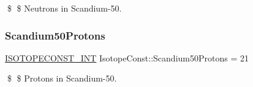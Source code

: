 \$ \$ Neutrons in Scandium-\/50. \mbox{\label{group___isotope_const-_scandium-_sc50_ga7c59f490117f7bad75000ead6ab72c63}} 
\subsubsection{\texorpdfstring{Scandium50\+Protons}{Scandium50Protons}}
{\footnotesize\ttfamily \mbox{\hyperlink{group___isotope_const-_macros_ga5f18360b3e99483a35c32d789e62621c}{I\+S\+O\+T\+O\+P\+E\+C\+O\+N\+S\+T\+\_\+\+I\+NT}} Isotope\+Const\+::\+Scandium50\+Protons = 21}

\$ \$ Protons in Scandium-\/50. 